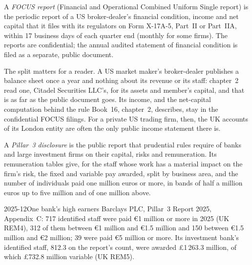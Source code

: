 \begin{definition}\label{def:in:reading-a-trading-firms-accounts:focus}
A \emph{FOCUS report} (Financial and Operational Combined Uniform Single report) is the periodic
report of a US broker-dealer's financial condition, income and net capital that it files with its regulators on Form
X-17A-5, Part~II or Part~IIA, within 17 business days of each quarter end (monthly for some firms). The reports are
confidential; the annual audited statement of financial condition is filed as a separate, public document.
\end{definition}

The split matters for a reader. A US market maker's broker-dealer publishes a balance sheet once a year and nothing
about its revenue or its staff: chapter~2 read one, Citadel Securities LLC's, for its assets and member's capital, and
that is as far as the public document goes. Its income, and the net-capital computation behind the rule Book~16,
chapter~2, describes, stay in the confidential FOCUS filings. For a private US trading firm, then, the UK accounts of
its London entity are often the only public income statement there is.

\begin{definition}\label{def:in:reading-a-trading-firms-accounts:pillar3}
A \emph{Pillar~3 disclosure} is the public report that prudential rules require of banks and
large investment firms on their capital, risks and remuneration. Its remuneration tables give, for the staff whose work
has a material impact on the firm's risk, the fixed and variable pay awarded, split by business area, and the number of
individuals paid one million euros or more, in bands of half a million euros up to five million and of one million
above.
\end{definition}

\begin{dated}{2025-12}{One bank's high earners}\label{dat:in:reading-a-trading-firms-accounts:pillar3}
Barclays PLC, Pillar~3 Report 2025, Appendix~C: 717 identified staff were paid \euro1 million or more in 2025 (UK REM4),
312 of them between \euro1 million and \euro1.5 million and 150 between \euro1.5 million and \euro2 million; 39 were paid
\euro5 million or more. Its investment bank's identified staff, 812.3 on the report's count, were awarded
\pounds1\,263.3 million, of which \pounds732.8 million variable (UK REM5).
\end{dated}

